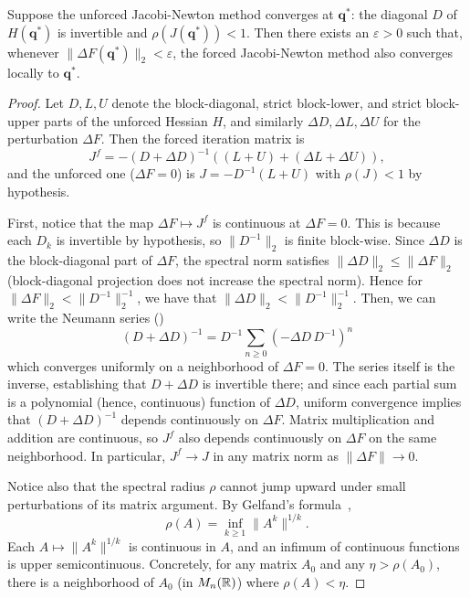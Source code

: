 \begin{theorem}\label{thm:forced-perturbation}
	Suppose the unforced Jacobi-Newton method converges at $\mathbf{q}^*$: the diagonal $D$ of $H(\mathbf{q}^*)$ is invertible and $\rho(J(\mathbf{q}^*)) < 1$. Then there exists an $\varepsilon > 0$ such that, whenever $\|\Delta F(\mathbf{q}^*)\|_2 < \varepsilon$, the forced Jacobi-Newton method also converges locally to $\mathbf{q}^*$.
\end{theorem}
\begin{proof}
	Let $D, L, U$ denote the block-diagonal, strict block-lower, and strict block-upper parts of the unforced Hessian $H$, and similarly $\Delta D, \Delta L, \Delta U$ for the perturbation $\Delta F$. Then the forced iteration matrix is
	\[
		J^f = -(D + \Delta D)^{-1}\left( (L + U) + (\Delta L + \Delta U) \right),
	\]
	and the unforced one ($\Delta F = 0$) is $J = -D^{-1}(L + U)$ with $\rho(J) < 1$ by hypothesis.

	First, notice that the map $\Delta F \mapsto J^f$ is continuous at $\Delta F = 0$. This is because each $D_k$ is invertible by hypothesis, so $\|D^{-1}\|_2$ is finite block-wise. Since $\Delta D$ is the block-diagonal part of $\Delta F$, the spectral norm satisfies $\|\Delta D\|_2 \leq \|\Delta F\|_2$ (block-diagonal projection does not increase the spectral norm). Hence for $\|\Delta F\|_2 < \|D^{-1}\|_2^{-1}$, we have that $\|\Delta D\|_2 < \|D^{-1}\|_2^{-1}$. Then, we can write the Neumann series (\cite[Corollary 5.6.16]{hornMatrixAnalysis2012})
	\[
		(D + \Delta D)^{-1} = D^{-1}\sum_{n \geq 0} (-\Delta D \, D^{-1})^n
	\]
	which converges uniformly on a neighborhood of $\Delta F = 0$. The series itself is the inverse, establishing that $D + \Delta D$ is invertible there; and since each partial sum is a polynomial (hence, continuous) function of $\Delta D$, uniform convergence implies that $(D + \Delta D)^{-1}$ depends continuously on $\Delta F$. Matrix multiplication and addition are continuous, so $J^f$ also depends continuously on $\Delta F$ on the same neighborhood. In particular, $J^f \to J$ in any matrix norm as $\|\Delta F\| \to 0$.

	Notice also that the spectral radius $\rho$ cannot jump upward under small perturbations of its matrix argument. By Gelfand's formula~\cite[Cor.~5.6.14]{hornMatrixAnalysis2012},
	\[
		\rho(A) = \inf_{k \geq 1} \|A^k\|^{1/k}.
	\]
	Each $A \mapsto \|A^k\|^{1/k}$ is continuous in $A$, and an infimum of continuous functions is upper semicontinuous. Concretely, for any matrix $A_0$ and any $\eta > \rho(A_0)$, there is a neighborhood of $A_0$ (in $M_n({\mathbb{R}})$) where $\rho(A) < \eta$.



\end{proof}
